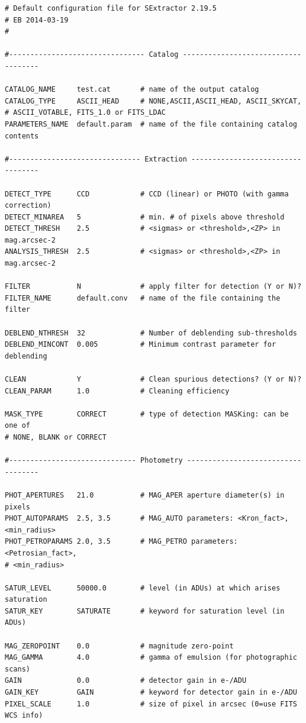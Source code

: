 \documentclass{aastex61}
\begin{document}
\begin{lstlisting}[caption = Configuration file for Source Extractor (YM)]
# Default configuration file for SExtractor 2.19.5
# EB 2014-03-19
#

#-------------------------------- Catalog ------------------------------------

CATALOG_NAME     test.cat       # name of the output catalog
CATALOG_TYPE     ASCII_HEAD     # NONE,ASCII,ASCII_HEAD, ASCII_SKYCAT,
# ASCII_VOTABLE, FITS_1.0 or FITS_LDAC
PARAMETERS_NAME  default.param  # name of the file containing catalog contents

#------------------------------- Extraction ----------------------------------

DETECT_TYPE      CCD            # CCD (linear) or PHOTO (with gamma correction)
DETECT_MINAREA   5              # min. # of pixels above threshold
DETECT_THRESH    2.5            # <sigmas> or <threshold>,<ZP> in mag.arcsec-2
ANALYSIS_THRESH  2.5            # <sigmas> or <threshold>,<ZP> in mag.arcsec-2

FILTER           N              # apply filter for detection (Y or N)?
FILTER_NAME      default.conv   # name of the file containing the filter

DEBLEND_NTHRESH  32             # Number of deblending sub-thresholds
DEBLEND_MINCONT  0.005          # Minimum contrast parameter for deblending

CLEAN            Y              # Clean spurious detections? (Y or N)?
CLEAN_PARAM      1.0            # Cleaning efficiency

MASK_TYPE        CORRECT        # type of detection MASKing: can be one of
# NONE, BLANK or CORRECT

#------------------------------ Photometry -----------------------------------

PHOT_APERTURES   21.0           # MAG_APER aperture diameter(s) in pixels
PHOT_AUTOPARAMS  2.5, 3.5       # MAG_AUTO parameters: <Kron_fact>,<min_radius>
PHOT_PETROPARAMS 2.0, 3.5       # MAG_PETRO parameters: <Petrosian_fact>,
# <min_radius>

SATUR_LEVEL      50000.0        # level (in ADUs) at which arises saturation
SATUR_KEY        SATURATE       # keyword for saturation level (in ADUs)

MAG_ZEROPOINT    0.0            # magnitude zero-point
MAG_GAMMA        4.0            # gamma of emulsion (for photographic scans)
GAIN             0.0            # detector gain in e-/ADU
GAIN_KEY         GAIN           # keyword for detector gain in e-/ADU
PIXEL_SCALE      1.0            # size of pixel in arcsec (0=use FITS WCS info)


\end{lstlisting}
\end{document}

